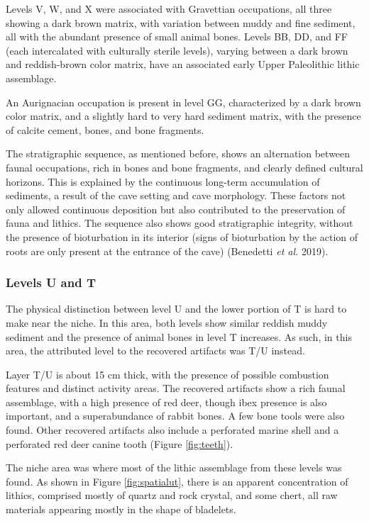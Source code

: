 \documentclass[12pt,twoside]{reedthesis}
\begin{document}
Levels V, W, and X were associated with Gravettian occupations, all three showing a dark brown matrix, with variation between muddy and fine sediment, all with the abundant presence of small animal bones. Levels BB, DD, and FF (each intercalated with culturally sterile levels), varying between a dark brown and reddish-brown color matrix, have an associated early Upper Paleolithic lithic assemblage.

An Aurignacian occupation is present in level GG, characterized by a dark brown color matrix, and a slightly hard to very hard sediment matrix, with the presence of calcite cement, bones, and bone fragments.

The stratigraphic sequence, as mentioned before, shows an alternation between faunal occupations, rich in bones and bone fragments, and clearly defined cultural horizons. This is explained by the continuous long-term accumulation of sediments, a result of the cave setting and cave morphology. These factors not only allowed continuous deposition but also contributed to the preservation of fauna and lithics. The sequence also shows good stratigraphic integrity, without the presence of bioturbation in its interior (signs of bioturbation by the action of roots are only present at the entrance of the cave) (Benedetti \emph{et al.} 2019).

\hypertarget{levels-u-and-t}{%
\subsubsection{Levels U and T}\label{levels-u-and-t}}

The physical distinction between level U and the lower portion of T is hard to make near the niche. In this area, both levels show similar reddish muddy sediment and the presence of animal bones in level T increases. As such, in this area, the attributed level to the recovered artifacts was T/U instead.

Layer T/U is about 15 cm thick, with the presence of possible combustion features and distinct activity areas. The recovered artifacts show a rich faunal assemblage, with a high presence of red deer, though ibex presence is also important, and a superabundance of rabbit bones. A few bone tools were also found. Other recovered artifacts also include a perforated marine shell and a perforated red deer canine tooth (Figure \ref{fig:teeth}).

The niche area was where most of the lithic assemblage from these levels was found. As shown in Figure \ref{fig:spatialut}, there is an apparent concentration of lithics, comprised mostly of quartz and rock crystal, and some chert, all raw materials appearing mostly in the shape of bladelets.
\end{document}
